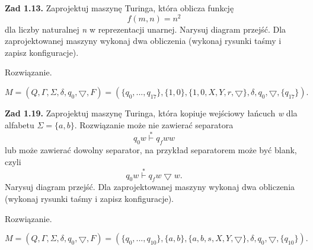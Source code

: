\documentclass[12pt]{article}
\begin{document}
\newpage

\noindent\textbf{Zad 1.13.} Zaprojektuj maszynę Turinga, która oblicza funkcję
\[f(m,n)=n^2\]
dla liczby naturalnej \textit{n} w reprezentacji unarnej. Narysuj diagram przejść. Dla zaprojektowanej maszyny wykonaj dwa obliczenia (wykonaj rysunki taśmy i zapisz konfiguracje).

 Rozwiązanie.
 
\[M=(Q,\Gamma,\Sigma,\delta,q_0,\bigtriangledown,F)=(\{q_0,...,q_{17}\},\{1,0\},\{1,0,X,Y,r,\bigtriangledown\},\delta,q_0,\bigtriangledown,\{q_{17}\}).\]

\newpage

\noindent\textbf{Zad 1.19.} Zaprojektuj maszynę Turinga, która kopiuje wejściowy łańcuch \textit{w} dla alfabetu $\Sigma=\{a,b\}$. Rozwiązanie może nie zawierać separatora
\[q_0w \overset{*}{\vdash} q_fww\]
lub  może  zawierać  dowolny  separator,  na  przykład  separatorem  może  być blank, czyli
\[q_0w \overset{*}{\vdash} q_fw \bigtriangledown w.\]
Narysuj diagram przejść. Dla zaprojektowanej maszyny wykonaj dwa obliczenia (wykonaj rysunki taśmy i zapisz konfiguracje).

 Rozwiązanie.
 
\[M=(Q,\Gamma,\Sigma,\delta,q_0,\bigtriangledown,F)=(\{q_0,...,q_{10}\},\{a,b\},\{a,b,s,X,Y,\bigtriangledown\},\delta,q_0,\bigtriangledown,\{q_{10}\}).\]
\end{document}
